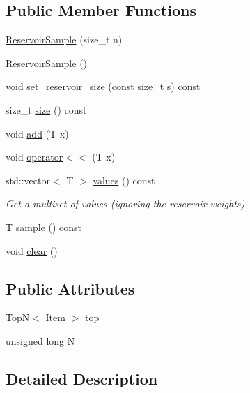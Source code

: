 \subsection*{Public Member Functions}
\begin{DoxyCompactItemize}
\item 
\hyperlink{class_reservoir_sample_a0fb545c8e65ad4978a6a67f615aa5a63}{Reservoir\+Sample} (size\+\_\+t n)
\item 
\hyperlink{class_reservoir_sample_a625597ecfb271c57a288475b4601f7c4}{Reservoir\+Sample} ()
\item 
void \hyperlink{class_reservoir_sample_ae67a44361cb145cc2f355290ff4babad}{set\+\_\+reservoir\+\_\+size} (const size\+\_\+t s) const
\item 
size\+\_\+t \hyperlink{class_reservoir_sample_a53a41ec89cedfec21c7924aa98347659}{size} () const
\item 
void \hyperlink{class_reservoir_sample_a471e41debe8c7081cbae2f5a1ca4ab54}{add} (T x)
\item 
void \hyperlink{class_reservoir_sample_a06e60e404cf49a9261f51d6b07bbf017}{operator$<$$<$} (T x)
\item 
std\+::vector$<$ T $>$ \hyperlink{class_reservoir_sample_a0f0abf510882715b487f2254b6af25b1}{values} () const
\begin{DoxyCompactList}\small\item\em Get a multiset of values (ignoring the reservoir weights) \end{DoxyCompactList}\item 
T \hyperlink{class_reservoir_sample_adc52ee8c3b5cbb7fd364315614d35595}{sample} () const
\item 
void \hyperlink{class_reservoir_sample_a8527b800cc94f227a7793e8c93055d82}{clear} ()
\end{DoxyCompactItemize}
\subsection*{Public Attributes}
\begin{DoxyCompactItemize}
\item 
\hyperlink{class_top_n}{TopN}$<$ \hyperlink{class_reservoir_sample_1_1_item}{Item} $>$ \hyperlink{class_reservoir_sample_a94a92f438328cbca4aa5f0ba92867142}{top}
\item 
unsigned long \hyperlink{class_reservoir_sample_a33f6cc3a51f9591f6e25dacf0cf8e663}{N}
\end{DoxyCompactItemize}


\subsection{Detailed Description}
